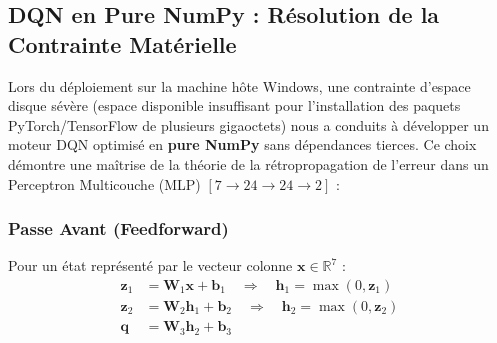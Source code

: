 \documentclass[11pt,a4paper]{article}
\begin{document}
\subsection{DQN en Pure NumPy : Résolution de la Contrainte Matérielle}
Lors du déploiement sur la machine hôte Windows, une contrainte d'espace disque sévère (espace disponible insuffisant pour l'installation des paquets PyTorch/TensorFlow de plusieurs gigaoctets) nous a conduits à développer un moteur DQN optimisé en \textbf{pure NumPy} sans dépendances tierces.
Ce choix démontre une maîtrise de la théorie de la rétropropagation de l'erreur dans un Perceptron Multicouche (MLP) $[7 \rightarrow 24 \rightarrow 24 \rightarrow 2]$ :

\subsubsection{Passe Avant (Feedforward)}
Pour un état représenté par le vecteur colonne $\mathbf{x} \in \mathbb{R}^7$ :
\begin{align}
    \mathbf{z}_1 &= \mathbf{W}_1 \mathbf{x} + \mathbf{b}_1 \quad \Rightarrow \quad \mathbf{h}_1 = \max(0, \mathbf{z}_1) \\
    \mathbf{z}_2 &= \mathbf{W}_2 \mathbf{h}_1 + \mathbf{b}_2 \quad \Rightarrow \quad \mathbf{h}_2 = \max(0, \mathbf{z}_2) \\
    \mathbf{q} &= \mathbf{W}_3 \mathbf{h}_2 + \mathbf{b}_3
\end{align}
\end{document}
